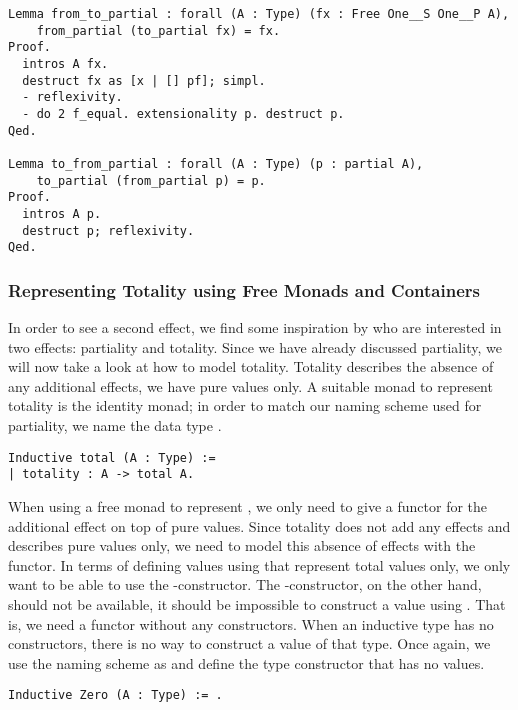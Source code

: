 \begin{verbatim}
Lemma from_to_partial : forall (A : Type) (fx : Free One__S One__P A),
    from_partial (to_partial fx) = fx.
Proof.
  intros A fx.
  destruct fx as [x | [] pf]; simpl.
  - reflexivity.
  - do 2 f_equal. extensionality p. destruct p.
Qed.

Lemma to_from_partial : forall (A : Type) (p : partial A),
    to_partial (from_partial p) = p.
Proof.
  intros A p.
  destruct p; reflexivity.
Qed.
\end{verbatim}

\subsubsection{Representing Totality using Free Monads and Containers}
\label{subsub:totality_container}
In order to see a second effect, we find some inspiration by
\citet{abel2005verifying} who are interested in two effects:
partiality and totality.
Since we have already discussed partiality, we will now take a look at
how to model totality.
Totality describes the absence of any additional effects, we have pure
values only.
A suitable monad to represent totality is the identity monad; in order
to match our naming scheme used for partiality, we name the data type
.

\begin{verbatim}
Inductive total (A : Type) :=
| totality : A -> total A.
\end{verbatim}

When using a free monad to represent , we only need to
give a functor for the additional effect on top of pure values.
Since totality does not add any effects and describes pure values
only, we need to model this absence of effects with the functor.
In terms of defining values using  that represent total
values only, we only want to be able to use the
-constructor.
The -constructor, on the other hand, should not be
available, it should be impossible to construct a value using
.
That is, we need a functor without any constructors.
When an inductive type has no constructors, there is no way to
construct a value of that type.
Once again, we use the naming scheme as \citeauthor{swierstra2008data}
and define the type constructor  that has no values.

\begin{verbatim}
Inductive Zero (A : Type) := .
\end{verbatim}

